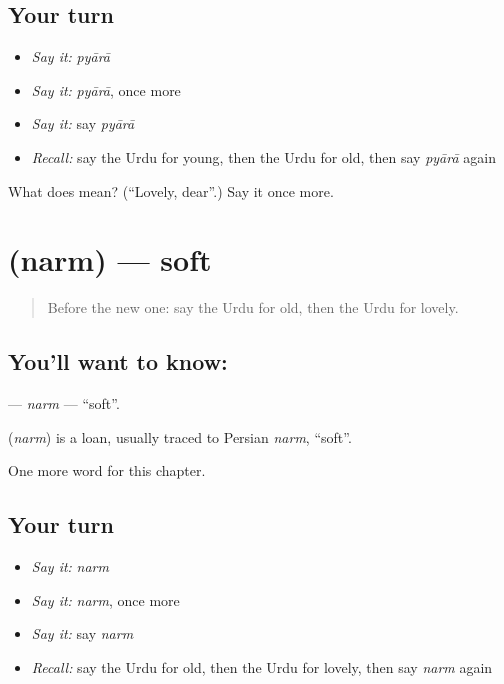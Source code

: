 \subsection*{Your turn}
\begin{itemize}
\raggedright
  \item \emph{Say it:} \emph{pyārā}
  \item \emph{Say it:} \emph{pyārā}, once more
  \item \emph{Say it:} say \emph{pyārā}
  \item \emph{Recall:} say the Urdu for young, then the Urdu for old, then say \emph{pyārā} again
\end{itemize}

\begin{tcolorbox}[breakable,colback=teal!4,colframe=teal!35!black,title={Before you move on}]
What does  mean? (\textquotedblleft{}Lovely, dear\textquotedblright{}.) Say it once more.
\end{tcolorbox}
\section[\texorpdfstring{\ur{نرم} (narm)}{نرم (narm)}]{ (narm) — soft}

\label{lesson:UR-C133-narm}



\begin{quote}
Before the new one: say the Urdu for old, then the Urdu for lovely.
\end{quote}

\subsection*{You'll want to know: }
\textbf{} — \emph{narm} — \textquotedblleft{}soft\textquotedblright{}.

\begin{cousinweb}
\textbf{} (\emph{narm}) is a loan, usually traced to Persian \emph{narm}, \textquotedblleft{}soft\textquotedblright{}.
\end{cousinweb}

\begin{grammarlens}[title={What you've built}]
One more word for this chapter.
\end{grammarlens}

\subsection*{Your turn}
\begin{itemize}
\raggedright
  \item \emph{Say it:} \emph{narm}
  \item \emph{Say it:} \emph{narm}, once more
  \item \emph{Say it:} say \emph{narm}
  \item \emph{Recall:} say the Urdu for old, then the Urdu for lovely, then say \emph{narm} again
\end{itemize}

